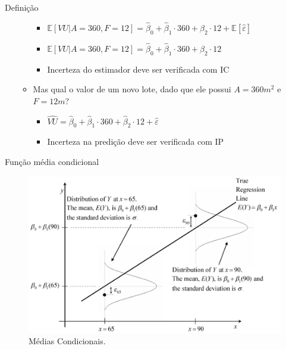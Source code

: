 \documentclass[9pt,ignorenonframetext,aspectratio=169]{beamer}
\providecommand{\tightlist}{%
  \setlength{\itemsep}{0pt}\setlength{\parskip}{0pt}}
\begin{document}
\begin{frame}{Definição}
\begin{itemize}[<+->]
\begin{itemize}[<+->]
    \begin{itemize}[<+->]
    \tightlist
    \item
      \(\mathbb E [VU|A = 360, F = 12] = \hat \beta_0 + \hat \beta_1 \cdot 360 + \hat \beta_2 \cdot 12 + \mathbb E[\hat \varepsilon]\)
    \item
      \(\mathbb E [VU|A = 360, F = 12] = \hat \beta_0 + \hat \beta_1 \cdot 360 + \hat \beta_2 \cdot 12\)
    \item
      Incerteza do estimador deve ser verificada com IC
    \end{itemize}
  \item
    Mas qual o valor de um novo lote, dado que ele possui \(A = 360m^2\)
    e \(F = 12m\)?

    \begin{itemize}[<+->]
    \tightlist
    \item
      \(\hat{VU} = \hat \beta_0 + \hat \beta_1 \cdot 360 + \hat \beta_2 \cdot 12 + \hat \varepsilon\)
    \item
      Incerteza na predição deve ser verificada com IP
    \end{itemize}
  \end{itemize}
\end{itemize}

\end{frame}

\begin{frame}{Função média condicional}
\protect\hypertarget{funuxe7uxe3o-muxe9dia-condicional}{}

\begin{figure}

{\centering \includegraphics[width=0.7\linewidth]{../../images/RlmM2} 

}

\caption{Médias Condicionais.}\label{fig:unnamed-chunk-1}
\end{figure}

\end{frame}
\end{document}
